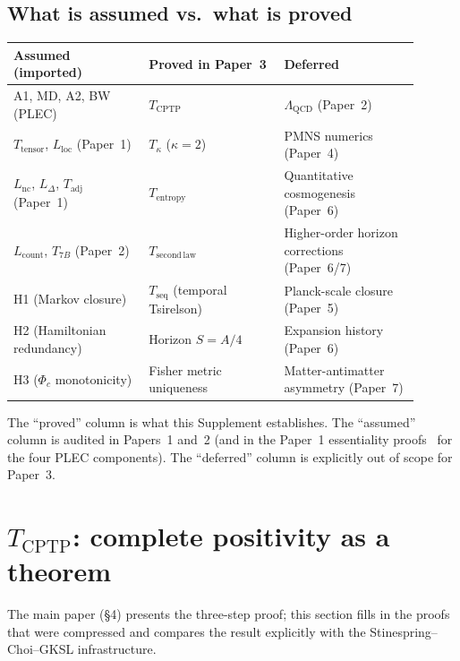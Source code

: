 \documentclass[11pt]{article}
\theoremstyle{remark}
\begin{document}
\subsection{What is assumed vs.\ what is proved}

\begin{center}
\small
\begin{tabular}{p{0.3\linewidth}p{0.3\linewidth}p{0.3\linewidth}}
\toprule
\textbf{Assumed (imported)} & \textbf{Proved in Paper~3} & \textbf{Deferred}\\
\midrule
A1, MD, A2, BW (PLEC) & $T_{\mathrm{CPTP}}$ & $\Lambda_{\mathrm{QCD}}$ (Paper~2)\\
$T_{\mathrm{tensor}}$, $L_{\mathrm{loc}}$ (Paper~1) & $T_\kappa$ ($\kappa=2$) & PMNS numerics (Paper~4)\\
$L_{\mathrm{nc}}$, $L_\Delta$, $T_{\mathrm{adj}}$ (Paper~1) & $T_{\mathrm{entropy}}$ & Quantitative cosmogenesis (Paper~6)\\
$L_{\mathrm{count}}$, $T_{7B}$ (Paper~2) & $T_{\mathrm{second\,law}}$ & Higher-order horizon corrections (Paper~6/7)\\
H1 (Markov closure) & $T_{\mathrm{seq}}$ (temporal Tsirelson) & Planck-scale closure (Paper~5)\\
H2 (Hamiltonian redundancy) & Horizon $S = A/4$ & Expansion history (Paper~6)\\
H3 ($\Phi_c$ monotonicity) & Fisher metric uniqueness & Matter-antimatter asymmetry (Paper~7)\\
\bottomrule
\end{tabular}
\end{center}

The ``proved'' column is what this Supplement establishes.  The ``assumed''
column is audited in Papers~1 and~2 (and in the Paper~1 essentiality
proofs~\cite{Paper1} for the four PLEC components).  The ``deferred''
column is explicitly out of scope for Paper~3.


\section{$T_{\mathrm{CPTP}}$: complete positivity as a theorem}
\label{sec:TCPTP}

The main paper (\S 4) presents the three-step proof; this
section fills in the proofs that were compressed and compares the result
explicitly with the Stinespring--Choi--GKSL infrastructure.
\end{document}
